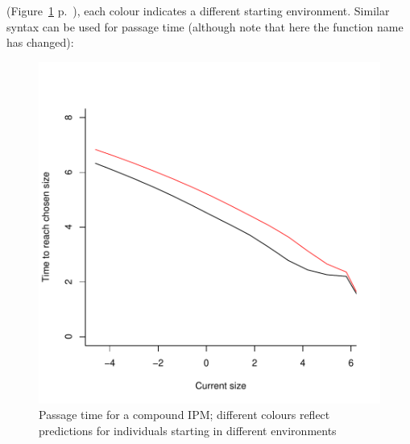 \documentclass{article}
\begin{document}
(Figure~\ref{fig:five} p.~\pageref{fig:five}), 
each colour indicates a different starting environment. Similar syntax can be used for passage time (although note that here the function name has changed): 
\begin{figure}
\begin{center}
\includegraphics{IPMpack_vignette-fig5}
\end{center}
\caption{Passage time for a compound IPM;   different colours reflect predictions for individuals starting in different environments}
\label{fig:five}
\end{figure}
\end{document}
